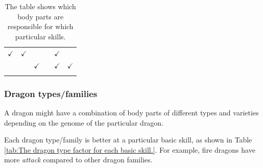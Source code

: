 \documentclass[12pt]{article}
\begin{document}
\begin{table}[!ht]
\begin{tabular}{p{0.84in}p{0.84in}p{0.84in}p{0.84in}p{0.84in}p{0.84in}}
\multicolumn{1}{p{0.84in}}{\cellcolor[HTML]{F0F0F0}\( \checkmark \)} & 
\multicolumn{1}{p{0.84in}}{\cellcolor[HTML]{F0F0F0}\( \checkmark \)} & 
\multicolumn{1}{p{0.84in}}{\cellcolor[HTML]{F0F0F0}{\fontsize{10pt}{12.0pt}\selectfont  $\times$  }} & 
\multicolumn{1}{p{0.84in}}{\cellcolor[HTML]{F0F0F0}{\fontsize{10pt}{12.0pt}\selectfont  $\times$  }} & 
\multicolumn{1}{p{0.84in}}{\cellcolor[HTML]{F0F0F0}\( \checkmark \)} \\
\hhline{~~~~~~}
\multicolumn{1}{p{0.84in}}{{\fontsize{10pt}{12.0pt}\selectfont Pattern}} & 
\multicolumn{1}{p{0.84in}}{\cellcolor[HTML]{F0F0F0}{\fontsize{10pt}{12.0pt}\selectfont  $\times$  }} & 
\multicolumn{1}{p{0.84in}}{\cellcolor[HTML]{F0F0F0}\( \checkmark \)} & 
\multicolumn{1}{p{0.84in}}{\cellcolor[HTML]{F0F0F0}{\fontsize{10pt}{12.0pt}\selectfont  $\times$  }} & 
\multicolumn{1}{p{0.84in}}{\cellcolor[HTML]{F0F0F0}\( \checkmark \)} & 
\multicolumn{1}{p{0.84in}}{\cellcolor[HTML]{F0F0F0}\( \checkmark \)} \\
\hhline{~~~~~~}

\end{tabular}\caption{The table shows which body parts are responsible for which particular skills.}
\label{tab:The table shows which body parts are responsible for which particular skills.}

 \end{table}





\setlength{\parskip}{9.96pt}
\subsubsection{Dragon types/families}\label{Dragon types/families}   \par

A dragon might have a combination of body parts of different types and varieties depending on the genome of the particular dragon.\par

Each dragon type/family is better at a particular basic skill, as shown in  Table \ref{tab:The dragon type factor for each basic skill.}. For example, fire dragons have more \textit{attack} compared to other dragon families.\par



\end{document}
